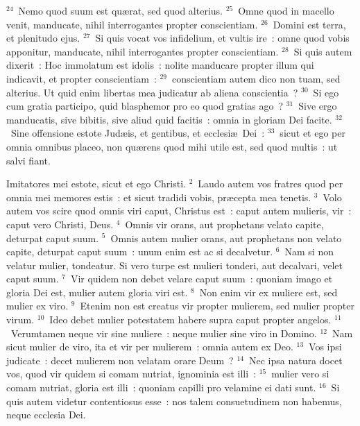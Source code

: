 ${}^{24}$~Nemo quod suum est qu\ae rat, sed quod alterius.
${}^{25}$~Omne quod in macello venit, manducate, nihil interrogantes propter conscientiam.
${}^{26}$~Domini est terra, et plenitudo ejus.
${}^{27}$~Si quis vocat vos infidelium, et vultis ire~: omne quod vobis apponitur, manducate, nihil interrogantes propter conscientiam.
${}^{28}$~Si quis autem dixerit~: Hoc immolatum est idolis~: nolite manducare propter illum qui indicavit, et propter conscientiam~:
${}^{29}$~conscientiam autem dico non tuam, sed alterius. Ut quid enim libertas mea judicatur ab aliena conscientia~?
${}^{30}$~Si ego cum gratia participo, quid blasphemor pro eo quod gratias ago~?
${}^{31}$~Sive ergo manducatis, sive bibitis, sive aliud quid facitis~: omnia in gloriam Dei facite.
${}^{32}$~Sine offensione estote Jud\ae is, et gentibus, et ecclesi\ae\ Dei~:
${}^{33}$~sicut et ego per omnia omnibus placeo, non qu\ae rens quod mihi utile est, sed quod multis~: ut salvi fiant.

\lettrine[lines=3,image=true,loversize=0.05,lraise=-0.03]{I}{}mitatores mei estote, sicut et ego Christi.
${}^{2}$~Laudo autem vos fratres quod per omnia mei memores estis~: et sicut tradidi vobis, pr\ae cepta mea tenetis.
${}^{3}$~Volo autem vos scire quod omnis viri caput, Christus est~: caput autem mulieris, vir~: caput vero Christi, Deus.
${}^{4}$~Omnis vir orans, aut prophetans velato capite, deturpat caput suum.
${}^{5}$~Omnis autem mulier orans, aut prophetans non velato capite, deturpat caput suum~: unum enim est ac si decalvetur.
${}^{6}$~Nam si non velatur mulier, tondeatur. Si vero turpe est mulieri tonderi, aut decalvari, velet caput suum.
${}^{7}$~Vir quidem non debet velare caput suum~: quoniam imago et gloria Dei est, mulier autem gloria viri est.
${}^{8}$~Non enim vir ex muliere est, sed mulier ex viro.
${}^{9}$~Etenim non est creatus vir propter mulierem, sed mulier propter virum.
${}^{10}$~Ideo debet mulier potestatem habere supra caput propter angelos.
${}^{11}$~Verumtamen neque vir sine muliere~: neque mulier sine viro in Domino.
${}^{12}$~Nam sicut mulier de viro, ita et vir per mulierem~: omnia autem ex Deo.
${}^{13}$~Vos ipsi judicate~: decet mulierem non velatam orare Deum~?
${}^{14}$~Nec ipsa natura docet vos, quod vir quidem si comam nutriat, ignominia est illi~:
${}^{15}$~mulier vero si comam nutriat, gloria est illi~: quoniam capilli pro velamine ei dati sunt.
${}^{16}$~Si quis autem videtur contentiosus esse~: nos talem consuetudinem non habemus, neque ecclesia Dei.


